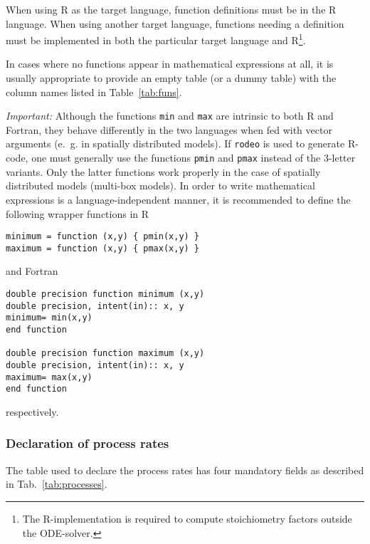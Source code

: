 \documentclass[a4paper]{article}
\newcommand{\rodeo}{\texttt{rodeo}}
\begin{document}
When using R as the target language, function definitions must be in the R 
language. When using another target language, functions needing a definition 
must be implemented in both the particular target language and R\footnote{The 
R-implementation is required to compute stoichiometry factors outside the 
ODE-solver.}.

In cases where no functions appear in mathematical expressions at all, it is 
usually appropriate to provide an empty table (or a dummy table) with the column 
names listed in Table~\ref{tab:funs}.

\emph{Important:} Although the functions \texttt{min} and \texttt{max} are 
intrinsic to both R and Fortran, they behave differently in the two 
languages when fed with vector arguments (e.~g. in spatially distributed 
models). If \rodeo{} is used to generate R-code, one must generally use the 
functions \texttt{pmin} and \texttt{pmax} instead of the 3-letter variants. Only 
the latter functions work properly in the case of spatially distributed models 
(multi-box models). In order to write mathematical
expressions is a language-independent manner, it is recommended to define the 
following wrapper functions in R

\begin{verbatim}
minimum = function (x,y) { pmin(x,y) }
maximum = function (x,y) { pmax(x,y) }
\end{verbatim}

and Fortran

\begin{verbatim}
double precision function minimum (x,y)
double precision, intent(in):: x, y
minimum= min(x,y)
end function

double precision function maximum (x,y)
double precision, intent(in):: x, y
maximum= max(x,y)
end function
\end{verbatim}

respectively.

\subsubsection{Declaration of process rates} \label{sec:input:tables:processes}

The table used to declare the process rates has four mandatory fields as described in Tab.~\ref{tab:processes}.
\end{document}
